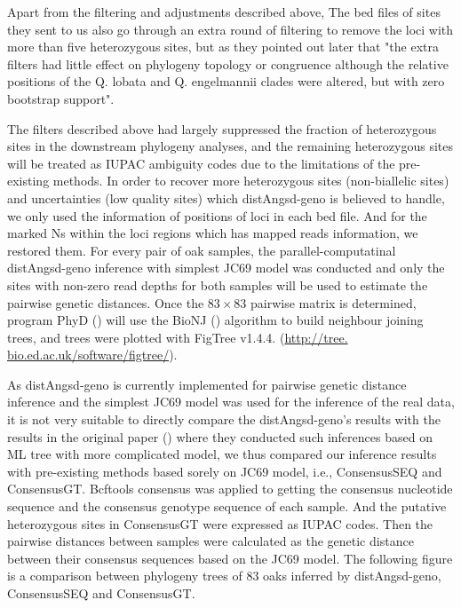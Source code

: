 \documentclass{article}
\begin{document}
Apart from the filtering and adjustments described above, The bed files of sites they sent to us also go through an extra round of filtering to remove the loci with more than five heterozygous sites, but as they pointed out later that "the extra filters had little effect on phylogeny topology or congruence although the relative positions of the Q. lobata and Q. engelmannii clades were altered, but with zero bootstrap support".

The filters described above had largely suppressed the fraction of heterozygous sites in the downstream phylogeny analyses, and the remaining heterozygous sites will be treated as IUPAC ambiguity codes due to the limitations of the pre-existing methods. In order to recover more heterozygous sites (non-biallelic sites) and uncertainties (low quality sites) which distAngsd-geno is believed to handle, we only used the information of positions of loci in each bed file. And for the marked Ns within the loci regions which has mapped reads information, we restored them. For every pair of oak samples, the parallel-computatinal distAngsd-geno inference with simplest JC69 model was conducted and only the sites with non-zero read depths for both samples will be used to estimate the pairwise genetic distances.  Once the $83\times 83$ pairwise matrix is determined, program PhyD (\cite{Criscuolo:2008}) will use the BioNJ (\cite{Gascuel:1997}) algorithm to build neighbour joining trees, and trees were plotted with FigTree v1.4.4. (\url{http://tree. bio.ed.ac.uk/software/figtree/}). 

As distAngsd-geno is currently implemented for pairwise genetic distance inference and the simplest JC69 model was used for the inference of the real data, it is not very suitable to directly compare the distAngsd-geno's results with the results in the original paper (\cite{Fitz-Gibbon_Hipp_Pham_Manos_Sork:2017}) where they conducted such inferences based on ML tree with more complicated model, we thus compared our inference results with pre-existing methods based sorely on JC69 model, i.e., ConsensusSEQ and ConsensusGT. Bcftools consensus was applied to getting the consensus nucleotide sequence and the consensus genotype sequence of each sample. And the putative heterozygous sites in ConsensusGT were expressed as IUPAC codes. Then the pairwise distances between samples were calculated as the genetic distance between their consensus sequences based on the JC69 model. The following figure is a comparison between phylogeny trees of $83$ oaks inferred by distAngsd-geno, ConsensusSEQ and ConsensusGT.
\end{document}
